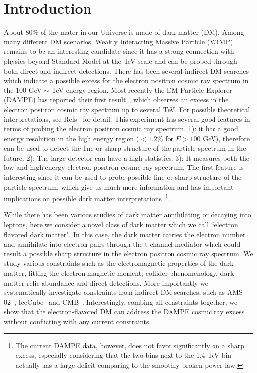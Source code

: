 \documentclass[aps,prd,letterpaper,showpacs,twocolumn,preprintnumbers,floatfix,superscriptaddress]{revtex4-1}
\begin{document}
\section{ Introduction}
About $80\%$ of the mater in our Universe is made of dark matter (DM). Among many different DM scenarios, Weakly Interacting Massive Particle (WIMP) remains to be an interesting candidate since it has a strong connection with physics beyond Standard Model at the TeV scale and can be probed through both direct and indirect detections. There has been several indirect DM searches~\cite{Aguilar:2013qda,FermiLAT:2011ab,Adriani:2017efm} which indicate a possible excess for the electron positron cosmic ray spectrum in the 100 GeV $\sim$ TeV energy region. Most recently the DM Particle Explorer (DAMPE) has reported their first result~\cite{Ambrosi:2017wek}, which observes an excess in the electron positron cosmic ray spectrum up to several TeV. For possible theoretical interpretations, see Refs~\cite{Yuan:2017ysv,Fan:2017sor,Fang:2017tvj,Fang:2017tvj,Duan:2017pkq,Gu:2017gle,Zu:2017dzm,Tang:2017lfb,Huang:2017egk,Athron:2017drj,Cao:2017ydw,Liu:2017rgs,Duan:2017qwj,Gu:2017bdw,Chao:2017yjg} for detail. This experiment has several good features in terms of probing the electron positron cosmic ray spectrum. 1): it has a good energy resolution in the high energy region ($<1.2 \%$ for $E>100$ GeV), therefore can be used to detect the line or sharp structure of the particle spectrum in the future. 2): The large detector can have a high statistics. 3): It measures both the low and high energy electron positron cosmic ray spectrum. The first feature is interesting since it can be used to probe possible line or sharp structure of the particle spectrum, which give us much more information and has important implications on possible dark matter interpretations~\footnote{The current DAMPE data, however, does not favor significantly on a sharp excess, especially considering that the two bins next to the 1.4 TeV bin actually has a large deficit comparing to the smoothly broken power-law.}. 

While there has been various studies of dark matter annihilating or decaying into leptons, here we consider a novel class of dark matter which we call ``electron flavored dark matter". In this case, the dark matter carries the electron number and annihilate into electron pairs through the t-channel mediator which could result a possible sharp structure in the electron positron cosmic ray spectrum. We study various constraints such as the electromagnetic properties of the dark matter, fitting the electron magnetic moment, collider phenomenology, dark matter relic abundance and direct detections. More importantly we systematically investigate constraints from indirect DM searches, such as AMS-02~\cite{Aguilar:2013qda}, IceCube~\cite{Aartsen:2016pfc} and CMB~\cite{Ade:2015xua}. Interestingly, combing all constraints together, we show that the electron-flavored DM can address the DAMPE cosmic ray excess without conflicting with any current constraints. 
\end{document}
